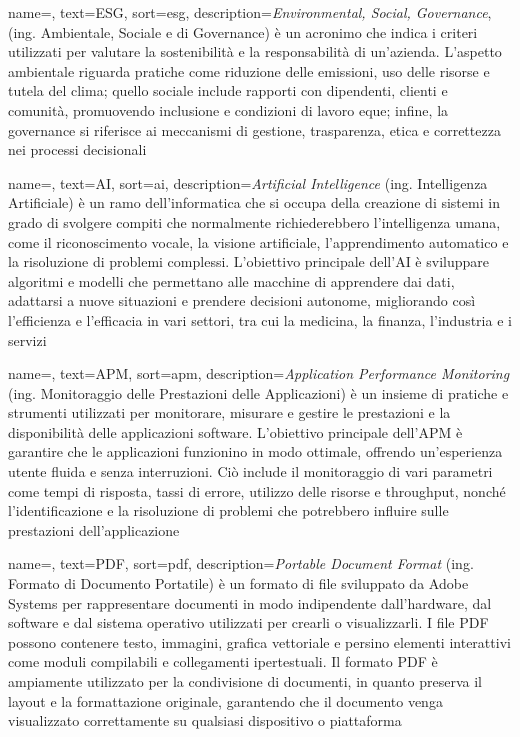  {
    name=,
    text=ESG,
    sort=esg,
    description={\emph{Environmental, Social, Governance}, (ing. Ambientale, Sociale e di Governance) è un acronimo che indica i criteri utilizzati per valutare la sostenibilità e la responsabilità di un'azienda. L'aspetto ambientale riguarda pratiche come riduzione delle emissioni, uso delle risorse e tutela del clima; quello sociale include rapporti con dipendenti, clienti e comunità, promuovendo inclusione e condizioni di lavoro eque; infine, la governance si riferisce ai meccanismi di gestione, trasparenza, etica e correttezza nei processi decisionali}
}

 {
    name=,
    text=AI,
    sort=ai,
    description={\emph{Artificial Intelligence} (ing. Intelligenza Artificiale) è un ramo dell'informatica che si occupa della creazione di sistemi in grado di svolgere compiti che normalmente richiederebbero l'intelligenza umana, come il riconoscimento vocale, la visione artificiale, l'apprendimento automatico e la risoluzione di problemi complessi. L'obiettivo principale dell'AI è sviluppare algoritmi e modelli che permettano alle macchine di apprendere dai dati, adattarsi a nuove situazioni e prendere decisioni autonome, migliorando così l'efficienza e l'efficacia in vari settori, tra cui la medicina, la finanza, l'industria e i servizi}
}

 {
    name=,
    text=APM,
    sort=apm,
    description={\emph{Application Performance Monitoring} (ing. Monitoraggio delle Prestazioni delle Applicazioni) è un insieme di pratiche e strumenti utilizzati per monitorare, misurare e gestire le prestazioni e la disponibilità delle applicazioni software. L'obiettivo principale dell'APM è garantire che le applicazioni funzionino in modo ottimale, offrendo un'esperienza utente fluida e senza interruzioni. Ciò include il monitoraggio di vari parametri come tempi di risposta, tassi di errore, utilizzo delle risorse e throughput, nonché l'identificazione e la risoluzione di problemi che potrebbero influire sulle prestazioni dell'applicazione}
}

 {
    name=,
    text=PDF,
    sort=pdf,
    description={\emph{Portable Document Format} (ing. Formato di Documento Portatile) è un formato di file sviluppato da Adobe Systems per rappresentare documenti in modo indipendente dall'hardware, dal software e dal sistema operativo utilizzati per crearli o visualizzarli. I file PDF possono contenere testo, immagini, grafica vettoriale e persino elementi interattivi come moduli compilabili e collegamenti ipertestuali. Il formato PDF è ampiamente utilizzato per la condivisione di documenti, in quanto preserva il layout e la formattazione originale, garantendo che il documento venga visualizzato correttamente su qualsiasi dispositivo o piattaforma}
}

